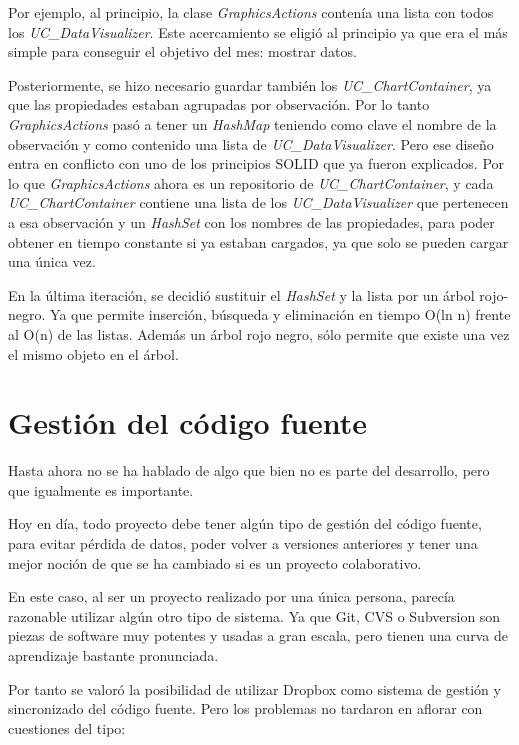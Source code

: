 Por ejemplo, al principio, la clase \emph{GraphicsActions} conten\'ia una lista con todos los 
\emph{UC\_DataVisualizer}. Este
acercamiento se eligi\'o al principio ya que era el m\'as simple para conseguir el objetivo del mes: mostrar datos.

Posteriormente, se hizo necesario guardar tambi\'en los \emph{UC\_ChartContainer}, ya que las propiedades estaban agrupadas por
observaci\'on. Por lo tanto \emph{GraphicsActions} pas\'o a tener un \emph{HashMap} teniendo como clave el nombre de la 
observaci\'on
y como contenido una lista de \emph{UC\_DataVisualizer}. Pero ese dise\~no entra en conflicto con uno de los principios
SOLID que ya fueron explicados. Por lo que \emph{GraphicsActions} ahora es un repositorio de 
\emph{UC\_ChartContainer},
y cada \emph{UC\_ChartContainer} contiene una lista de los\emph{ UC\_DataVisualizer} que 
pertenecen a esa observaci\'on y un \emph{HashSet}
con los nombres de las propiedades, para poder obtener en tiempo constante si ya estaban cargados, ya que solo se pueden cargar
una \'unica vez.

En la \'ultima iteraci\'on, se decidi\'o sustituir el \emph{HashSet} y la lista por un \'arbol rojo-negro. Ya que permite
inserci\'on, b\'usqueda y eliminaci\'on en tiempo O(ln n) frente al O(n) de las listas. 
Adem\'as un \'arbol rojo negro, s\'olo permite que existe una vez el mismo objeto en el \'arbol.

\section{Gesti\'{o}n del c\'{o}digo fuente}
Hasta ahora no se ha hablado de algo que bien no es parte del desarrollo, pero que igualmente es importante.

Hoy en d\'ia, todo proyecto debe tener alg\'un tipo de gesti\'on del c\'odigo fuente, para evitar p\'erdida de datos, 
poder volver a versiones anteriores y tener una mejor noci\'on de que se ha cambiado si es un proyecto colaborativo.

En este caso, al ser un proyecto realizado por una \'unica persona, parec\'ia razonable utilizar alg\'un otro tipo
de sistema. Ya que Git, CVS o Subversion son piezas de software muy potentes y usadas a gran escala, pero tienen
una curva de aprendizaje bastante pronunciada.

Por tanto se valor\'o la posibilidad de utilizar Dropbox como sistema de gesti\'on y sincronizado del c\'odigo fuente.
Pero los problemas no tardaron en aflorar con cuestiones del tipo:

